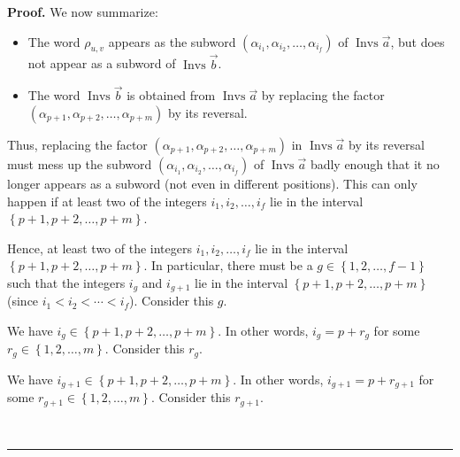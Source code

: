 \documentclass[numbers=enddot,12pt,final,onecolumn,notitlepage,abstracton]{scrartcl}%
\theoremstyle{definition}
\newenvironment{proof}[1][Proof]{\noindent\textbf{#1.} }{\ \rule{0.5em}{0.5em}}
\begin{document}
\begin{proof}
We now summarize:

\begin{itemize}
\item The word $\rho_{u,v}$ appears as the subword $\left(  \alpha_{i_{1}%
},\alpha_{i_{2}},\ldots,\alpha_{i_{f}}\right)  $ of $\operatorname*{Invs}%
\overrightarrow{a}$, but does not appear as a subword of $\operatorname*{Invs}%
\overrightarrow{b}$.

\item The word $\operatorname*{Invs}\overrightarrow{b}$ is obtained from
$\operatorname*{Invs}\overrightarrow{a}$ by replacing the factor
\newline$\left(  \alpha_{p+1},\alpha_{p+2},\ldots,\alpha_{p+m}\right)  $ by
its reversal.
\end{itemize}

Thus, replacing the factor $\left(  \alpha_{p+1},\alpha_{p+2},\ldots
,\alpha_{p+m}\right)  $ in $\operatorname*{Invs}\overrightarrow{a}$ by its
reversal must mess up the subword $\left(  \alpha_{i_{1}},\alpha_{i_{2}%
},\ldots,\alpha_{i_{f}}\right)  $ of $\operatorname*{Invs}\overrightarrow{a}$
badly enough that it no longer appears as a subword (not even in different
positions). This can only happen if at least two of the integers $i_{1}%
,i_{2},\ldots,i_{f}$ lie in the interval $\left\{  p+1,p+2,\ldots,p+m\right\}
$.

Hence, at least two of the integers $i_{1},i_{2},\ldots,i_{f}$ lie in the
interval $\left\{  p+1,p+2,\ldots,p+m\right\}  $. In particular, there must be
a $g\in\left\{  1,2,\ldots,f-1\right\}  $ such that the integers $i_{g}$ and
$i_{g+1}$ lie in the interval $\left\{  p+1,p+2,\ldots,p+m\right\}  $ (since
$i_{1}<i_{2}<\cdots<i_{f}$). Consider this $g$.

We have $i_{g}\in\left\{  p+1,p+2,\ldots,p+m\right\}  $. In other words,
$i_{g}=p+r_{g}$ for some $r_{g}\in\left\{  1,2,\ldots,m\right\}  $. Consider
this $r_{g}$.

We have $i_{g+1}\in\left\{  p+1,p+2,\ldots,p+m\right\}  $. In other words,
$i_{g+1}=p+r_{g+1}$ for some $r_{g+1}\in\left\{  1,2,\ldots,m\right\}  $.
Consider this $r_{g+1}$.


\end{proof}
\end{document}
